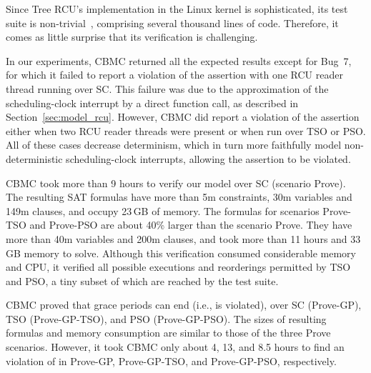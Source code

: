 


Since Tree RCU's implementation in the Linux kernel is sophisticated, its test suite
is non-trivial~\cite{PaulMcKenney2005rcutorture}, comprising several thousand
lines of code.
Therefore, it comes as little surprise that its verification is 
challenging.

In our experiments, CBMC returned all the expected results except
for Bug~7, for which it failed to report a violation of the
assertion  with one RCU reader thread running
over SC.  This failure was due to the approximation of the
scheduling-clock interrupt by a direct function call,
as described in Section~\ref{sec:model_rcu}. 
However, CBMC did report a violation of the assertion
either when two RCU reader threads were present or when run over
TSO or PSO.
All of these cases decrease determinism,
which in turn more faithfully model non-deterministic
scheduling-clock interrupts, allowing the assertion to be violated.

CBMC took more than 9 hours to verify our model over SC (scenario Prove). 
The resulting SAT formulas have more than 5m
constraints, 30m variables and 149m clauses, and occupy
23\,GB of memory.  The formulas for scenarios Prove-TSO and
Prove-PSO are about
40\% larger than the scenario Prove.  They have more than 40m
variables and 200m clauses, and took more than 11 hours and 33\,GB
memory to solve.
Although this verification consumed considerable memory
and CPU, it verified all possible executions and
reorderings permitted by TSO and PSO,
a tiny subset of which are reached by
the  test suite.

CBMC proved that grace periods can end (i.e.,  is
violated), over SC (Prove-GP), TSO (Prove-GP-TSO), and PSO
(Prove-GP-PSO).  The sizes of resulting formulas and memory consumption
are similar to those of the three Prove scenarios.
However, it took CBMC only about 4, 13, and 8.5 hours to find an
violation of  in Prove-GP, Prove-GP-TSO, and Prove-GP-PSO, respectively.

